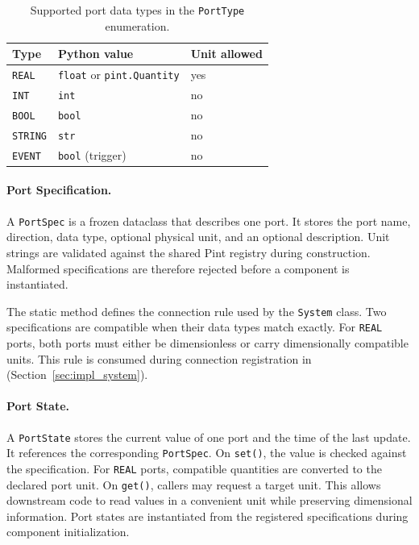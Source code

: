 \begin{table}[htbp]
  \centering
  \small
  \caption[Supported port data types]{Supported port data types in the \texttt{PortType} enumeration.}  \label{tab:impl_port_types}
  \begin{tabular}{lll}
    \toprule
    \textbf{Type}   & \textbf{Python value}                    & \textbf{Unit allowed} \\
    \midrule
    \texttt{REAL}   & \texttt{float} or \texttt{pint.Quantity} & yes                   \\
    \texttt{INT}    & \texttt{int}                             & no                    \\
    \texttt{BOOL}   & \texttt{bool}                            & no                    \\
    \texttt{STRING} & \texttt{str}                             & no                    \\
    \texttt{EVENT}  & \texttt{bool} (trigger)                  & no                    \\
    \bottomrule
  \end{tabular}
\end{table}

\paragraph{Port Specification.}
A \texttt{PortSpec} is a frozen dataclass that describes one port.
It stores the port name, direction, data type, optional physical unit, and an optional description.
Unit strings are validated against the shared Pint registry during construction.
Malformed specifications are therefore rejected before a component is instantiated.

The static method  defines the connection rule used by the \texttt{System} class.
Two specifications are compatible when their data types match exactly.
For \texttt{REAL} ports, both ports must either be dimensionless or carry dimensionally compatible units.
This rule is consumed during connection registration in  (Section~\ref{sec:impl_system}).

\paragraph{Port State.}
A \texttt{PortState} stores the current value of one port and the time of the last update.
It references the corresponding \texttt{PortSpec}.
On \texttt{set()}, the value is checked against the specification.
For \texttt{REAL} ports, compatible quantities are converted to the declared port unit.
On \texttt{get()}, callers may request a target unit.
This allows downstream code to read values in a convenient unit while preserving dimensional information.
Port states are instantiated from the registered specifications during component initialization.

